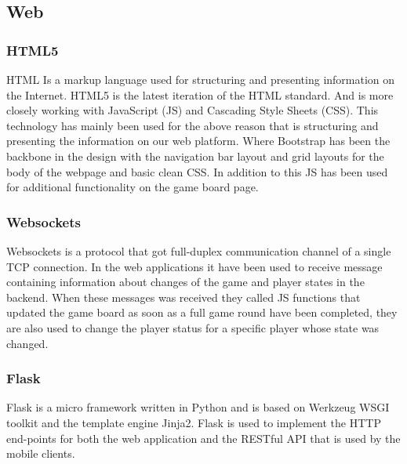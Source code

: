 \subsection{Web}
\subsubsection{HTML5}
HTML Is a markup language used for structuring and presenting information on the Internet. HTML5\cite{ref_html5_1}\cite{ref_html5_2} is the latest iteration of the HTML standard. And is more closely working with JavaScript (JS) and Cascading Style Sheets (CSS). This technology has mainly been used for the above reason that is structuring and presenting the information on our web platform. Where Bootstrap has been the backbone in the design with the navigation bar layout and grid layouts for the body of the webpage and basic clean CSS. In addition to this JS has been used for additional functionality on the game board page. 
\subsubsection{Websockets}
Websockets\cite{ref_websocket} is a protocol that got full-duplex communication channel of a single TCP connection. In the web applications it have been used to receive message containing information about changes of the game and player states in the backend. When these messages was received they called JS functions that updated the game board as soon as a full game round have been completed, they are also used to change the player status for a specific player whose state was changed.
\subsubsection{Flask}
Flask\cite{ref_flask} is a micro framework written in Python and is based on Werkzeug WSGI toolkit and the template engine Jinja2\cite{ref_jinja2}. Flask is used to implement the HTTP end-points for both the web application and the RESTful API that is used by the mobile clients.

